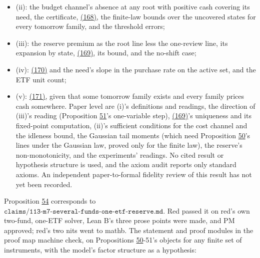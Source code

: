\documentclass[11pt]{article}
\begin{document}
\begin{itemize}
  \item (ii): the budget channel's absence at any root with positive cash
  covering its need, the certificate, \hyperref[eq:168]{(168)}, the finite-law bounds
  over the uncovered states for every tomorrow family, and the
  threshold errors;
  \item (iii): the reserve premium as the root line less the one-review line,
  its expansion by state, \hyperref[eq:169]{(169)}, its bound, and the no-shift case;
  \item (iv): \hyperref[eq:170]{(170)} and the need's slope in the purchase rate on the active
  set, and the ETF unit count;
  \item (v): \hyperref[eq:171]{(171)}, given that some tomorrow family exists and every family
  prices cash somewhere.
Paper level are (i)'s definitions and readings, the direction of
(iii)'s reading (Proposition \hyperref[res:Proposition-51]{51}'s one-variable step), \hyperref[eq:169]{(169)}'s
uniqueness and its fixed-point computation, (ii)'s sufficient
conditions for the cost channel and the idleness bound, the Gaussian
tail moments (which need Proposition \hyperref[res:Proposition-50]{50}'s lines under the Gaussian law,
proved only for the finite law), the reserve's non-monotonicity, and
the experiments' readings. No cited result or hypothesis structure is
used, and the axiom audit reports only standard axioms. An independent
paper-to-formal fidelity review of this result has not yet been
recorded.
\end{itemize}

Proposition \hyperref[res:Proposition-54]{54} corresponds to
\(\texttt{claims/113-m7-several-funds-one-etf-reserve.md}\). Red passed it on red's
own two-fund, one-ETF solver, Lean B's three prose points were made,
and PM approved; red's two nits went to mathb. The statement and proof
modules in the proof map machine check, on Propositions \hyperref[res:Proposition-50]{50}-51's objects
for any finite set of instruments, with the model's factor structure
as a hypothesis:
\end{document}
